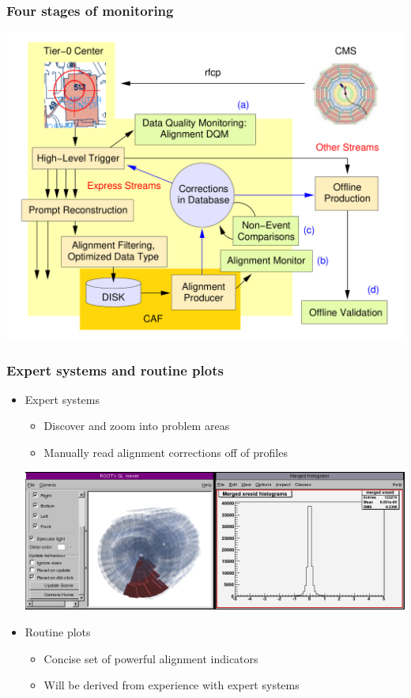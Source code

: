\documentclass[compress]{beamer}
\begin{document}
\begin{frame}
\frametitle{Four stages of monitoring}
\begin{center}
\includegraphics[height=0.8\textheight]{grand_diagram0.pdf}
\end{center}
\end{frame}

\begin{frame}
\frametitle{Expert systems and routine plots}
\begin{itemize}
\item Expert systems
\begin{itemize}
\item Discover and zoom into problem areas
\item Manually read alignment corrections off of profiles
\end{itemize}

\vfill
\includegraphics[width=\linewidth]{monitoring_tool.png}

\vfill
\item Routine plots
\begin{itemize}
\item Concise set of powerful alignment indicators
\item Will be derived from experience with expert systems
\end{itemize}
\end{itemize}
\end{frame}
\end{document}
